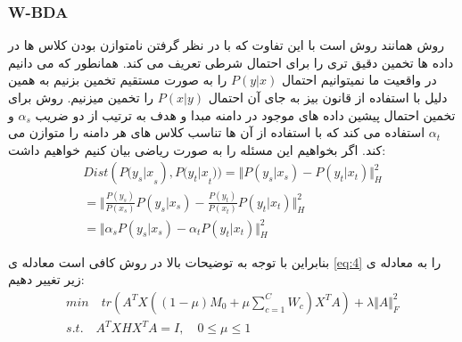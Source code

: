{{	 	\subsubsection{W-BDA}
	 	{
	 		روش 
	 		همانند روش 
	 		است با این تفاوت که با در نظر گرفتن نامتوازن بودن کلاس ها در داده ها تخمین دقیق تری را برای احتمال شرطی تعریف می کند.  همانطور که می دانیم در واقعیت ما نمیتوانیم احتمال 
	 		$P(y|x)$
	 		را به صورت مستقیم تخمین بزنیم به همین دلیل با استفاده از قانون بیز به جای آن احتمال 
	 		$P(x|y)$
	 		را تخمین میزنیم. روش 
	 		برای تخمین احتمال پیشین داده های موجود در دامنه مبدا و هدف به ترتیب از دو ضریب 
	 		$\alpha_s$
	 		و 
	 		$\alpha_t$
	 	  استفاده می کند که با استفاده از آن ها تناسب کلاس های هر دامنه را متوازن می کند. اگر بخواهیم این مسئله را به صورت ریاضی بیان کنیم خواهیم داشت:
	 		\begin{equation}
	 		\begin{aligned}
	 		Dist({P(y_s|x}_s),{P(y_t|x}_t))= \Vert P \left( y_{s} \vert x_{s} \right)  -P \left( y_{t} \vert x_{t} \right) \Vert  _{H}^{2}\\
	 		= \bigg \Vert \frac{P \left( y_{s} \right) }{P \left( x_{s} \right) }P \left( y_{s} \vert x_{s} \right)  -\frac{P \left( y_{t} \right) }{P \left( x_{t} \right) }P \left( y_{t} \vert x_{t} \right) \bigg \Vert  _{H}^{2}\quad \quad \quad \quad \quad\\
	 		= \Vert \alpha _{s}P \left( y_{s} \vert x_{s} \right)  - \alpha _{t}P \left( y_{t} \vert x_{t} \right)  \Vert  _{H}^{2} \quad \quad \quad \quad \quad \quad \quad \quad \quad 
	 		\end{aligned}
	 		\label{eq:7}
	 		\end{equation}
	 		
	 		بنابراین با توجه به توضیحات بالا در روش 
	 		کافی است معادله ی 
	 		\ref{eq:4}
	 		را به معادله ی زیر تغییر دهیم:
	 		\begin{equation}
	 		\begin{aligned}
	 		min \quad tr \left( A^{T}X \left( \left( 1 - \mu \right) M_{0} + \mu \sum _{c=1\mathrm{ }}^{C}W_{c} \right) X^{T}A \right) + \lambda \Vert A \Vert_{F}^{2} \\
	 		s.t. \quad A^{T}XHX^{T}A = I, \quad  0  \leq \mu \leq  1 \quad \quad \quad \quad \quad
	 		\label{eq:8}
	 		\end{aligned}
	 		\end{equation}
	 		
}}}
